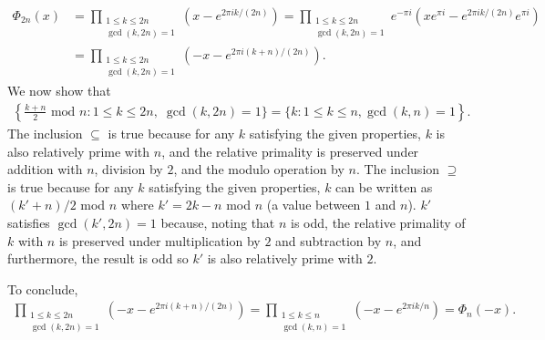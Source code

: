\documentclass[12pt]{article}
\begin{document}
\begin{enumerate}
\begin{enumerate}
            \begin{align*}
                \Phi_{2n}(x) &= \prod_{\substack{1 \leq k \leq 2n \\ \gcd(k, 2n) = 1}} (x - e^{2\pi ik/(2n)})
                = \prod_{\substack{1 \leq k \leq 2n \\ \gcd(k, 2n) = 1}} e^{-\pi i} (xe^{\pi i} - e^{2\pi ik/(2n)}e^{\pi i}) \\
                &= \prod_{\substack{1 \leq k \leq 2n \\ \gcd(k, 2n) = 1}} (-x - e^{2\pi i(k + n)/(2n)}).
            \end{align*}
            We now show that
            \begin{align*}
                \left\{ \frac{k + n}{2} \text{ mod } n : 1 \leq k \leq 2n, \; \gcd(k, 2n) = 1 \} = \{ k : 1 \leq k \leq n, \gcd(k, n) = 1 \right\}.
            \end{align*}
            The inclusion $\subseteq$ is true because for any $k$ satisfying the given properties, $k$ is also relatively prime with $n$, and the relative primality is preserved under addition with $n$, division by $2$, and the modulo operation by $n$. The inclusion $\supseteq$ is true because for any $k$ satisfying the given properties, $k$ can be written as $(k' + n) / 2$ mod $n$ where $k' = 2k - n$ mod $n$ (a value between $1$ and $n$). $k'$ satisfies $\gcd(k', 2n) = 1$ because, noting that $n$ is odd, the relative primality of $k$ with $n$ is preserved under multiplication by $2$ and subtraction by $n$, and furthermore, the result is odd so $k'$ is also relatively prime with $2$. \par
            To conclude,
            \begin{align*}
                \prod_{\substack{1 \leq k \leq 2n \\ \gcd(k, 2n) = 1}} (-x - e^{2\pi i(k + n)/(2n)})
                = \prod_{\substack{1 \leq k \leq n \\ \gcd(k, n) = 1}} (-x - e^{2\pi ik/n})
                = \Phi_n(-x).
            \end{align*}
    \end{enumerate}


\end{enumerate}
\end{document}
